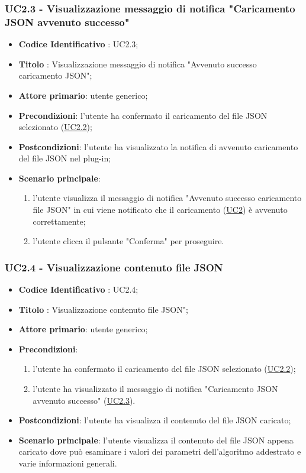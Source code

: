 		\label{par:UC2.3}
	\subsubsection{UC2.3 - Visualizzazione messaggio di notifica "Caricamento JSON avvenuto successo"}
		\begin{itemize}
			\item\textbf{Codice Identificativo} : UC2.3;
			\item\textbf{Titolo} : Visualizzazione messaggio di notifica "Avvenuto successo caricamento JSON";
			\item\textbf{Attore primario}: utente generico;
			\item\textbf{Precondizioni}: l'utente ha confermato il caricamento del file JSON selezionato (\hyperref[par:UC2.2]{UC2.2});
			\item\textbf{Postcondizioni}: l'utente ha visualizzato la notifica di avvenuto caricamento del file JSON nel plug-in;
			\item\textbf{Scenario principale}:
				\begin{enumerate}
					\item l'utente visualizza il messaggio di notifica "Avvenuto successo caricamento file JSON" in cui viene notificato che il caricamento (\hyperref[par:UC2]{UC2}) è avvenuto correttamente;
					\item l'utente clicca il pulsante "Conferma" per proseguire.		
				\end{enumerate}		
		\end{itemize}
		
		\label{par:UC2.4}
	\subsubsection{UC2.4 - Visualizzazione contenuto file JSON}
		\begin{itemize}
			\item\textbf{Codice Identificativo} : UC2.4;
			\item\textbf{Titolo} : Visualizzazione contenuto file JSON";
			\item\textbf{Attore primario}: utente generico;
			\item\textbf{Precondizioni}: 
				\begin{enumerate}
					\item l'utente ha confermato il caricamento del file JSON selezionato (\hyperref[par:UC2.2]{UC2.2});
					\item l'utente ha visualizzato il messaggio di notifica "Caricamento JSON avvenuto successo" (\hyperref[par:UC2.3]{UC2.3}).
				\end{enumerate}
			\item\textbf{Postcondizioni}: l'utente ha visualizza il contenuto del file JSON caricato;
			\item\textbf{Scenario principale}: l'utente visualizza il contenuto del file JSON appena caricato dove può esaminare i valori dei parametri dell'algoritmo addestrato e varie informazioni generali.
		\end{itemize}

